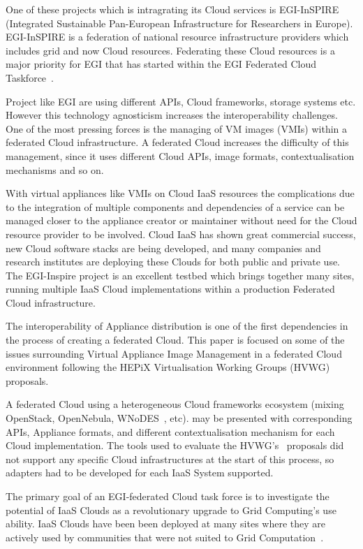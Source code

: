 \documentclass{cai}
\begin{document}
One of these projects which is intragrating its Cloud services is EGI-InSPIRE~\cite{egi} (Integrated Sustainable Pan-European Infrastructure for Researchers in Europe). EGI-InSPIRE is a federation of national resource infrastructure providers which includes grid and now Cloud resources. 
Federating these Cloud resources is a major priority for EGI that has started within the EGI Federated Cloud Taskforce~\cite{fedCloud}.

Project like EGI are using different APIs, Cloud frameworks, storage systems etc. 
However this technology agnosticism increases the interoperability challenges. One of the most pressing forces is the managing of VM images (VMIs) within a federated Cloud infrastructure.
A federated Cloud increases the difficulty of this management, since it uses different Cloud APIs, image formats, contextualisation mechanisms and so on. 

With virtual appliances like VMIs on Cloud IaaS resources the complications due to the integration of multiple components and dependencies of a service can be managed closer to the appliance creator or maintainer without need for the Cloud resource provider to be involved. 
Cloud IaaS has shown great commercial success, new Cloud software stacks are being developed, and many companies and research institutes are deploying these Clouds for both public and private use. 
The EGI-Inspire project is an excellent testbed which brings together many sites, running multiple IaaS Cloud implementations within a production Federated Cloud infrastructure.

The interoperability of Appliance distribution is one of the first dependencies in the process of creating a federated Cloud. This paper is focused on some of the issues surrounding Virtual Appliance Image Management in a federated Cloud environment following the HEPiX Virtualisation Working Groups (HVWG)~\cite{hepix} proposals.

A federated Cloud using a heterogeneous Cloud frameworks ecosystem (mixing OpenStack, OpenNebula, WNoDES~\cite{wnodes}, etc). may be presented with corresponding APIs, Appliance formats, and different contextualisation mechanism for each Cloud implementation. 
The tools used to evaluate the HVWG's~\cite{hepix} proposals did not support any specific Cloud infrastructures at the start of this process, so adapters had to be developed for each IaaS System supported. 

The primary goal of an EGI-federated Cloud task force is to investigate the potential of IaaS Clouds as a revolutionary upgrade to Grid Computing's use ability. 
IaaS Clouds have been been deployed at many sites where they are actively used by communities that were not suited to Grid Computation~\cite{gridCloud}. 
\end{document}
